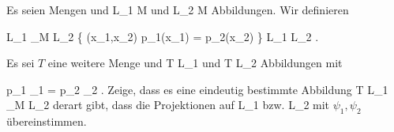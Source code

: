 {}
{





Es seien
 Mengen und
 {L_1 } { M
} {}
und
 {L_2 } { M
} {}
Abbildungen. Wir definieren

\mavergleichskettedisp
{\vergleichskette
{L_1 \times_M L_2
}
{ } { \left\{ (x_1,x_2)  \mid   p_1(x_1) = p_2(x_2)         \right\}
}
{ \subseteq} { L_1 \times L_2
}
{ } {
}
{ } {
}
}
{}{}{.}
 {Es sei $T$ eine weitere Menge und
 { T } { L_1
} {}
und
 { T } { L_2
} {}
Abbildungen mit

\mavergleichskettedisp
{\vergleichskette
{ p_1 \circ \psi_1
}
{ =} { p_2 \circ \psi_2
}
{ } {
}
{ } {
}
{ } {}
}
{}{}{.}
Zeige, dass es eine eindeutig bestimmte Abbildung
\maabbdisp {\psi} { T } { L_1 \times_M L_2
} {}
derart gibt, dass die Projektionen auf
\mathkor {} {L_1} {bzw.} {L_2} {}
mit $\psi_1,\psi_2$ übereinstimmen.
}





}
{} {}

